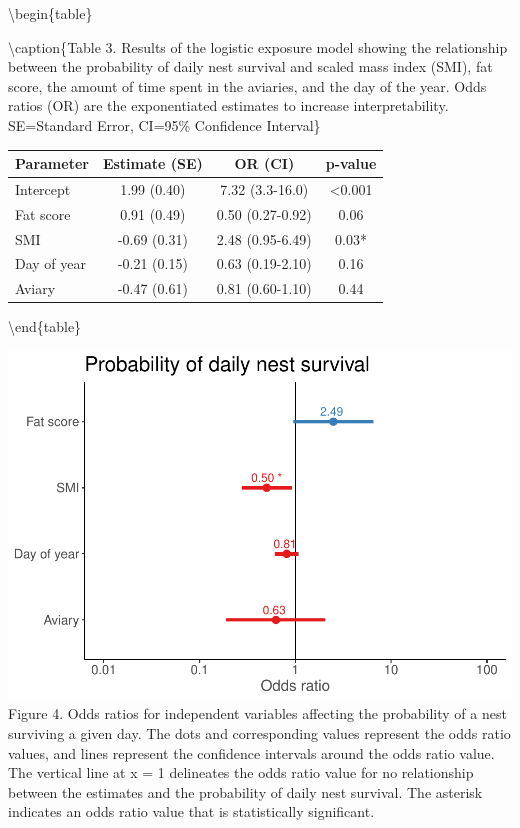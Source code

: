 \documentclass[
]{article}
\begin{document}
\textbackslash begin\{table\}

\textbackslash caption\{\label{tab:logexp}Table 3. Results of the
logistic exposure model showing the relationship between the probability
of daily nest survival and scaled mass index (SMI), fat score, the
amount of time spent in the aviaries, and the day of the year. Odds
ratios (OR) are the exponentiated estimates to increase
interpretability. SE=Standard Error, CI=95\% Confidence Interval\}
\centering

\begin{tabular}[t]{l|c|c|c}
\hline
Parameter & Estimate (SE) & OR (CI) & p-value\\
\hline
Intercept & 1.99 (0.40) & 7.32 (3.3-16.0) & <0.001\\
\hline
Fat score & 0.91 (0.49) & 0.50 (0.27-0.92) & 0.06\\
\hline
SMI & -0.69 (0.31) & 2.48 (0.95-6.49) & 0.03*\\
\hline
Day of year & -0.21 (0.15) & 0.63 (0.19-2.10) & 0.16\\
\hline
Aviary & -0.47 (0.61) & 0.81 (0.60-1.10) & 0.44\\
\hline
\end{tabular}

\textbackslash end\{table\}

\includegraphics{gcondition_files/figure-latex/logexp-1.pdf} Figure 4.
Odds ratios for independent variables affecting the probability of a
nest surviving a given day. The dots and corresponding values represent
the odds ratio values, and lines represent the confidence intervals
around the odds ratio value. The vertical line at x = 1 delineates the
odds ratio value for no relationship between the estimates and the
probability of daily nest survival. The asterisk indicates an odds ratio
value that is statistically significant.
\end{document}
